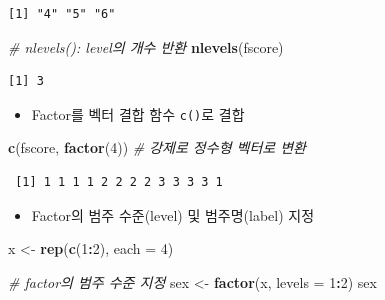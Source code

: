 \documentclass[
  11pt,
]{krantz}
\newenvironment{Shaded}{\begin{snugshade}}{\end{snugshade}}
\newcommand{\CommentTok}[1]{\textcolor[rgb]{0.37,0.37,0.37}{\textit{#1}}}
\newcommand{\DataTypeTok}[1]{\textcolor[rgb]{0.27,0.27,0.27}{#1}}
\newcommand{\DecValTok}[1]{\textcolor[rgb]{0.06,0.06,0.06}{#1}}
\newcommand{\KeywordTok}[1]{\textcolor[rgb]{0.27,0.27,0.27}{\textbf{#1}}}
\newcommand{\NormalTok}[1]{#1}
\newcommand{\OperatorTok}[1]{\textcolor[rgb]{0.43,0.43,0.43}{\textbf{#1}}}
\newcommand{\StringTok}[1]{\textcolor[rgb]{0.5,0.5,0.5}{#1}}
\providecommand{\tightlist}{%
  \setlength{\itemsep}{0pt}\setlength{\parskip}{0pt}}
\begin{document}
\begin{verbatim}
[1] "4" "5" "6"
\end{verbatim}

\begin{Shaded}
\begin{Highlighting}[]
\CommentTok{# nlevels(): level의 개수 반환}
\KeywordTok{nlevels}\NormalTok{(fscore)}
\end{Highlighting}
\end{Shaded}

\begin{verbatim}
[1] 3
\end{verbatim}

\normalsize

\begin{itemize}
\tightlist
\item
  Factor를 벡터 결합 함수 \texttt{c()}로 결합
\end{itemize}

\footnotesize

\begin{Shaded}
\begin{Highlighting}[]
\KeywordTok{c}\NormalTok{(fscore, }\KeywordTok{factor}\NormalTok{(}\DecValTok{4}\NormalTok{)) }\CommentTok{# 강제로 정수형 벡터로 변환}
\end{Highlighting}
\end{Shaded}

\begin{verbatim}
 [1] 1 1 1 1 2 2 2 2 3 3 3 3 1
\end{verbatim}

\normalsize

\begin{itemize}
\tightlist
\item
  Factor의 범주 수준(level) 및 범주명(label) 지정
\end{itemize}

\footnotesize

\begin{Shaded}
\begin{Highlighting}[]
\NormalTok{x <-}\StringTok{ }\KeywordTok{rep}\NormalTok{(}\KeywordTok{c}\NormalTok{(}\DecValTok{1}\OperatorTok{:}\DecValTok{2}\NormalTok{), }\DataTypeTok{each =} \DecValTok{4}\NormalTok{)}

\CommentTok{# factor의 범주 수준 지정}
\NormalTok{sex <-}\StringTok{ }\KeywordTok{factor}\NormalTok{(x, }\DataTypeTok{levels =} \DecValTok{1}\OperatorTok{:}\DecValTok{2}\NormalTok{)}
\NormalTok{sex}
\end{Highlighting}
\end{Shaded}
\end{document}

